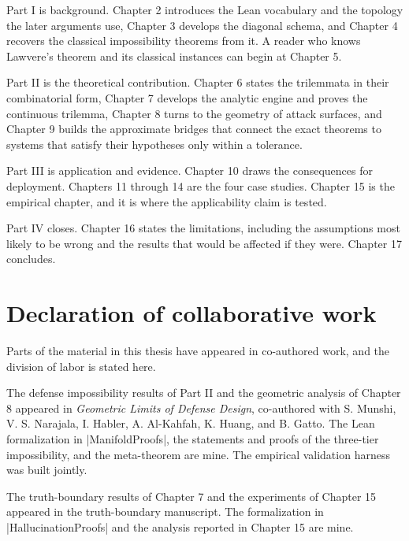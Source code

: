 \documentclass{memoir}
\begin{document}
Part I is background. Chapter 2 introduces the Lean vocabulary and the topology
the later arguments use, Chapter 3 develops the diagonal schema, and Chapter 4
recovers the classical impossibility theorems from it. A reader who knows
Lawvere's theorem and its classical instances can begin at Chapter 5.

Part II is the theoretical contribution. Chapter 6 states the trilemmata in
their combinatorial form, Chapter 7 develops the analytic engine and proves the
continuous trilemma, Chapter 8 turns to the geometry of attack surfaces, and
Chapter 9 builds the approximate bridges that connect the exact theorems to
systems that satisfy their hypotheses only within a tolerance.

Part III is application and evidence. Chapter 10 draws the consequences for
deployment. Chapters 11 through 14 are the four case studies. Chapter 15 is the
empirical chapter, and it is where the applicability claim is tested.

Part IV closes. Chapter 16 states the limitations, including the assumptions
most likely to be wrong and the results that would be affected if they were.
Chapter 17 concludes.



\section{Declaration of collaborative work}\label{Two--Schemas--of--Impossibility-005F-005F-005F--Machine--Checked--Limits--of--Trustworthy--Machine--Learning-005F-005F-005F--and--Why--They--Tighten--with--Capability----Introduction----Declaration--of--collaborative--work}

Parts of the material in this thesis have appeared in co-authored work, and the
division of labor is stated here.

The defense impossibility results of Part II and the geometric analysis of
Chapter 8 appeared in \emph{Geometric Limits of Defense Design}, co-authored with
S. Munshi, V. S. Narajala, I. Habler, A. Al-Kahfah, K. Huang, and B. Gatto. The
Lean formalization in \LeanVerb|ManifoldProofs|, the statements and proofs of the
three-tier impossibility, and the meta-theorem are mine. The empirical
validation harness was built jointly.

The truth-boundary results of Chapter 7 and the experiments of Chapter 15
appeared in the truth-boundary manuscript. The formalization in
\LeanVerb|HallucinationProofs| and the analysis reported in Chapter 15 are mine.
\end{document}
